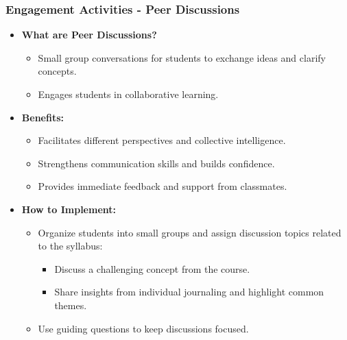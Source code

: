 \documentclass[aspectratio=169]{beamer}
\begin{document}
\begin{frame}[fragile]
    \frametitle{Engagement Activities - Peer Discussions}
    \begin{itemize}
        \item \textbf{What are Peer Discussions?}
        \begin{itemize}
            \item Small group conversations for students to exchange ideas and clarify concepts.
            \item Engages students in collaborative learning.
        \end{itemize}
        
        \item \textbf{Benefits:}
        \begin{itemize}
            \item Facilitates different perspectives and collective intelligence.
            \item Strengthens communication skills and builds confidence.
            \item Provides immediate feedback and support from classmates.
        \end{itemize}

        \item \textbf{How to Implement:}
        \begin{itemize}
            \item Organize students into small groups and assign discussion topics related to the syllabus:
            \begin{itemize}
                \item Discuss a challenging concept from the course.
                \item Share insights from individual journaling and highlight common themes.
            \end{itemize}
            \item Use guiding questions to keep discussions focused.
        \end{itemize}
    \end{itemize}
\end{frame}
\end{document}
